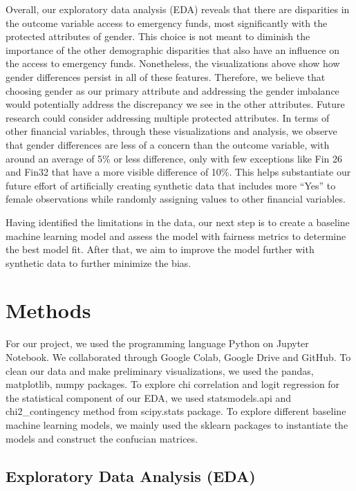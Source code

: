 \documentclass[12pt]{article}
\begin{document}
Overall, our exploratory data analysis (EDA) reveals that there are
disparities in the outcome variable access to emergency funds, most
significantly with the protected attributes of gender. This choice is
not meant to diminish the importance of the other demographic
disparities that also have an influence on the access to emergency
funds. Nonetheless, the visualizations above show how gender differences
persist in all of these features. Therefore, we believe that choosing
gender as our primary attribute and addressing the gender imbalance
would potentially address the discrepancy we see in the other
attributes. Future research could consider addressing multiple protected
attributes. In terms of other financial variables, through these
visualizations and analysis, we observe that gender differences are less
of a concern than the outcome variable, with around an average of 5\% or
less difference, only with few exceptions like Fin 26 and Fin32 that
have a more visible difference of 10\%. This helps substantiate our
future effort of artificially creating synthetic data that includes more
``Yes'' to female observations while randomly assigning values to other
financial variables.

Having identified the limitations in the data, our next step is to
create a baseline machine learning model and assess the model with
fairness metrics to determine the best model fit. After that, we aim to
improve the model further with synthetic data to further minimize the
bias.

\hypertarget{methods}{%
\section{Methods}\label{methods}}

For our project, we used the programming language Python on Jupyter
Notebook. We collaborated through Google Colab, Google Drive and GitHub.
To clean our data and make preliminary visualizations, we used the
pandas, matplotlib, numpy packages. To explore chi correlation and logit
regression for the statistical component of our EDA, we used
statsmodels.api and chi2\_contingency method from scipy.stats package.
To explore different baseline machine learning models, we mainly used
the sklearn packages to instantiate the models and construct the
confucian matrices.

\hypertarget{exploratory-data-analysis-eda}{%
\subsection{Exploratory Data Analysis
(EDA)}\label{exploratory-data-analysis-eda}}
\end{document}
